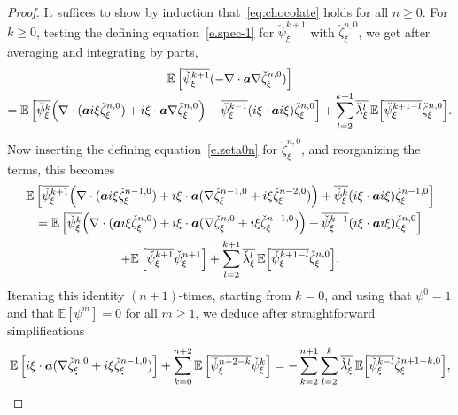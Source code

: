 \documentclass[JEP,XML,SOM,Unicode,published]{cedram}
\theoremstyle{plain}
\theoremstyle{definition}
\numberwithin{equation}{section}
\newcommand{\Aa}{\boldsymbol a}
\newcommand{\expec}[1]{\mathbb{E}\left[ #1 \right]}
\newcommand{\Bexpec}[1]{\mathbb{E}\Bigl[ #1 \Bigr]}
\begin{document}
\begin{proof}
It suffices to show by induction that~\eqref{eq:chocolate} holds for all $n\ge0$.
For $k\ge0$, testing the defining equation~\eqref{e.spec-1} for $\check\psi^{k+1}_\xi$ with $\check\zeta^{n,0}_\xi$, we get after averaging and integrating by parts,\vspace*{-3pt}
\begin{multline*}
\expec{\overline{\check \psi^{k+1}_\xi} (-\nabla \cdot \Aa \nabla \check\zeta^{n,0}_\xi)}\\[-3pt]
= \expec{\overline{\check\psi^k_\xi} \Big(\nabla \cdot (\Aa i \xi \check\zeta_\xi^{n,0})+i \xi \cdot \Aa\nabla \check\zeta_\xi^{n,0}\Big) +\overline{\check \psi_\xi^{k-1}}(i\xi \cdot\Aa i\xi)\check \zeta_\xi^{n,0}}
+\sum_{l=2}^{k+1}\overline{\check \lambda_\xi^l}\,\Bexpec{\overline{\check \psi_\xi^{k+1-l}}\check\zeta_\xi^{n,0}}.
\end{multline*}
Now inserting the defining equation~\eqref{e.zeta0n} for $\check\zeta_\xi^{n,0}$, and reorganizing the terms, this becomes\vspace*{-3pt}
\begin{multline*}
\expec{\overline{\check \psi_\xi^{k+1}} \Big(\nabla\cdot(\Aa i\xi\check\zeta_\xi^{n-1,0})+i\xi\cdot\Aa(\nabla\check\zeta_\xi^{n-1,0}+i\xi\check\zeta_\xi^{n-2,0})\Big)
+\overline{\check\psi_\xi^k} (i \xi \cdot \Aa i\xi)\check\zeta_\xi^{n-1,0} }\\
= \expec{\overline{\check\psi_\xi^k} \Big(\nabla \cdot (\Aa i \xi \check\zeta_\xi^{n,0})+ i \xi \cdot \Aa(\nabla \check\zeta_\xi^{n,0}+i\xi\check\zeta_\xi^{n-1,0})\Big)
+\overline{\check \psi_\xi^{k-1}}(i\xi \cdot\Aa i\xi)\check \zeta_\xi^{n,0}}\\
+\expec{\overline{\check \psi_\xi^{k+1}}\check\psi_\xi^{n+1}}
+\sum_{l=2}^{k+1}\overline{\check \lambda_\xi^l}\,\Bexpec{ \overline{\check \psi_\xi^{k+1-l}}\check\zeta_\xi^{n,0}}.
\end{multline*}
Iterating this identity $(n+1)$-times, starting from $k=0$, and using that $\psi^0=1$ and that $\expec{\psi^m}=0$ for all $m\geq 1$, we deduce after straightforward simplifications\vspace*{-3pt}
\begin{equation*}
\expec{i\xi \cdot \Aa(\nabla \check\zeta_\xi^{n,0}+i\xi\check\zeta_\xi^{n-1,0})}+\sum_{k=0}^{n+2}\expec{\overline{\check \psi_\xi^{n+2-k}}\check\psi_\xi^{k}}
=-\sum_{k=2}^{n+1}\sum_{l=2}^{k}\overline{\check \lambda_\xi^l}\,\Bexpec{ \overline{\check \psi_\xi^{k-l}}\check\zeta_\xi^{n+1-k,0}},
\end{equation*}

\end{proof}
\end{document}
